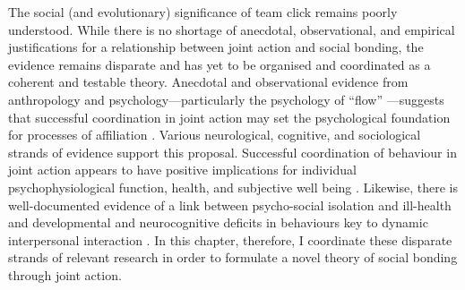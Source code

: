\begin{CJK}{UTF8}{gbsn}
The social (and evolutionary) significance of team click remains poorly understood.  While there is no shortage of anecdotal, observational, and empirical justifications for a relationship between joint action and social bonding, the evidence remains disparate and has yet to be organised and coordinated as a coherent and testable theory.  Anecdotal and observational evidence from anthropology and psychology---particularly the psychology of ``flow'' \citep{Csikszentmihalyi1992,Jackson1999}---suggests that successful coordination in joint action may set the psychological foundation for processes of affiliation \citep{Marsh2009}.  Various neurological, cognitive, and sociological strands of evidence support this proposal.  Successful coordination of behaviour in joint action appears to have positive implications for individual psychophysiological function, health, and subjective well being \citep{Wheatley2012}.  Likewise, there is well-documented evidence of a link between psycho-social isolation and ill-health and developmental and neurocognitive deficits in behaviours key to dynamic interpersonal interaction \citep[e.g.][]{Blakemore2005,Baron-Cohen1991}. In this chapter, therefore, I coordinate these disparate strands of relevant research in order to formulate a novel theory of social bonding through joint action.





\end{CJK}
